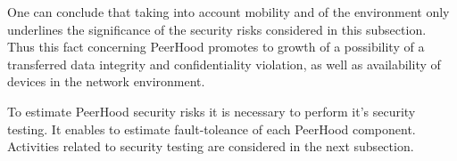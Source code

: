 %
One can conclude that taking into account mobility and  of the environment only underlines the significance of the security risks considered in this subsection. 
%
Thus this fact concerning PeerHood promotes to growth of a possibility of a transferred data integrity and confidentiality violation, as well as availability of devices in the network environment. 

%
To estimate PeerHood security risks it is necessary to perform it's security testing. 
%
It enables to estimate fault-toleance of each PeerHood component. 
%
Activities related to security testing are considered in the next subsection. 